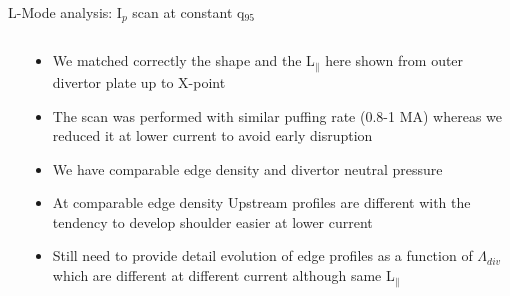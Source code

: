 \documentclass[10pt, compress]{beamer}
\newcommand\Fontvi{\fontsize{8}{7.2}\selectfont}
\begin{document}
\begin{frame}{L-Mode analysis: I$_p$ scan at constant q$_{95}$}
\Fontvi
  \vspace{-1cm}
\begin{columns}
  \begin{column}{0.65\textwidth}

  \end{column}
  \begin{column}{0.35\textwidth}
    \begin{itemize}
      \item<1|only@1> We matched correctly the shape and the L$_{\parallel}$
        here shown from outer divertor plate up to X-point 
      \item<2|only@2> The scan was performed with similar puffing rate (0.8-1
        MA) whereas we reduced it at lower current to avoid early disruption
      \item<2|only@2> We have comparable edge density and divertor neutral
        pressure 
      \item<3-> At comparable edge density Upstream profiles are
        different with the tendency to develop shoulder easier at
        lower current
      \item<4-> Still need to provide detail evolution of edge
        profiles as a function
        of $\Lambda_{div}$ which are different at different current
        although same L$_{\parallel}$
      \end{itemize}
    \end{column}
\end{columns}
\end{frame}
\end{document}
